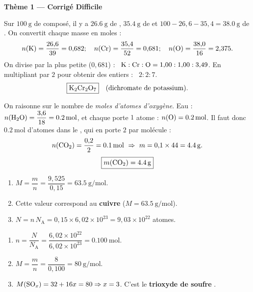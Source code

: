 \documentclass[11pt,a4paper]{article}
\begin{document}
\begin{center}{\large\bfseries\color{primarydark} Thème 1 — Corrigé Difficile}\end{center}

\begin{corrige}
Sur $\SI{100}{\gram}$ de composé, il y a $\SI{26.6}{\gram}$ de , $\SI{35.4}{\gram}$ de 
et $100-26{,}6-35{,}4 = \SI{38.0}{\gram}$ de . On convertit chaque masse en moles :
\[ n(\ce{K}) = \frac{26{,}6}{39} = 0{,}682 ;\quad n(\ce{Cr}) = \frac{35{,}4}{52} = 0{,}681 ;\quad
   n(\ce{O}) = \frac{38{,}0}{16} = 2{,}375. \]
On divise par la plus petite ($0{,}681$) : \ $\ce{K}:\ce{Cr}:\ce{O} = 1{,}00 : 1{,}00 : 3{,}49$.
En multipliant par $2$ pour obtenir des entiers : \ $2 : 2 : 7$.
\[ \boxed{\ce{K2Cr2O7}} \quad\text{(dichromate de potassium).} \]
\end{corrige}

\begin{corrige}
On raisonne sur le nombre de \emph{moles d'atomes d'oxygène}.
Eau : $n(\ce{H2O}) = \dfrac{3{,}6}{18} = \SI{0.2}{\mole}$, et chaque  porte $1$ atome  :
$n(\ce{O}) = \SI{0.2}{\mole}$.
Il faut donc $\SI{0.2}{\mole}$ d'atomes  dans le , qui en porte $2$ par molécule :
\[ n(\ce{CO2}) = \frac{0{,}2}{2} = \SI{0.1}{\mole}\ \Rightarrow\ m = 0{,}1\times 44 = \SI{4.4}{\gram}. \]
\[ \boxed{m(\ce{CO2}) = \SI{4.4}{\gram}} \]
\end{corrige}

\begin{corrige}
\begin{enumerate}[label=\alph*)]
  \item $M = \dfrac{m}{n} = \dfrac{9{,}525}{0{,}15} = \SI{63.5}{\gram\per\mole}$.
  \item Cette valeur correspond au \textbf{cuivre}  ($M=\SI{63.5}{\gram\per\mole}$).
  \item $N = n\,N_{\mathrm{A}} = 0{,}15\times 6{,}02\times10^{23} = 9{,}03\times10^{22}$ atomes.
\end{enumerate}
\end{corrige}

\begin{corrige}
\begin{enumerate}[label=\alph*)]
  \item $n = \dfrac{N}{N_{\mathrm{A}}} = \dfrac{6{,}02\times10^{22}}{6{,}02\times10^{23}} = \SI{0.100}{\mole}$.
  \item $M = \dfrac{m}{n} = \dfrac{8}{0{,}100} = \SI{80}{\gram\per\mole}$.
  \item $M(\ce{SO_x}) = 32 + 16x = 80 \Rightarrow x = 3$. C'est le \textbf{trioxyde de soufre} .
\end{enumerate}
\end{corrige}
\end{document}
